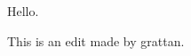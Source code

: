 \documentclass{grattanAlpha}
\begin{document}
Hello.

This is an edit made by grattan.
\end{document}
